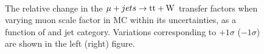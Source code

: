 \begin{figure}[!h]
  \centering
   ~~
  \\

  \caption{\label{fig:tfSyst_muon scale factor_muToTtw} The relative change in the $\mj \rightarrow \mathrm{tt+W}$ transfer
  factors when varying muon scale factor in MC within its uncertainties, as a function of \scalht and jet category. 
  Variations corresponding to $+1\sigma$ ($-1\sigma$) are shown in the left (right) figure. 
  }
\end{figure}

%
%

